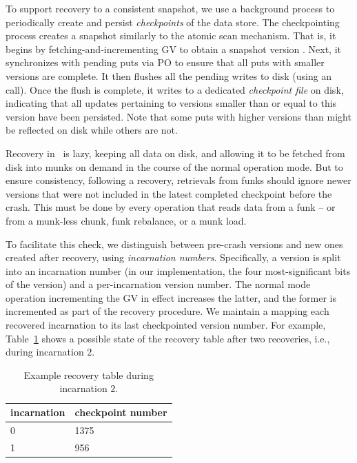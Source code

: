 To support recovery to a consistent snapshot, we use a background process to
periodically create and persist \emph{checkpoints} of the data store.
The checkpointing process creates a snapshot similarly to the atomic scan mechanism. That is, 
it begins by fetching-and-incrementing GV to obtain a 
 snapshot version .  Next, 
it synchronizes with pending puts via PO to ensure that all puts with smaller versions are complete. 
It then flushes all the pending writes to disk (using an  call). 
Once the flush is complete, it writes  to a dedicated \emph{checkpoint file} on disk,
indicating that all updates pertaining to versions smaller than or equal to this version have been persisted.
Note that some puts with higher versions than  might be reflected on disk while others are not. 

Recovery in \sys\ is lazy, keeping all data on disk, and 
allowing it to be fetched from disk into munks  on demand in the course of the normal operation mode. 
But to ensure consistency, following a recovery,  
retrievals from funks should ignore newer versions that were not included in the latest completed checkpoint before the crash. This must be done by every operation that reads data from a funk --  or  from a munk-less chunk, funk rebalance,  or a munk load. 

To facilitate this check, 
we distinguish between pre-crash versions and new ones created after recovery, using \emph{incarnation numbers}. Specifically, a version is split into an incarnation number (in our implementation, the four most-significant bits of the version) and a per-incarnation version number. The normal mode operation incrementing the GV in effect increases the latter, and the former is incremented as part of the recovery procedure. 
We maintain a  mapping each recovered incarnation to its last checkpointed version number. 
For example, Table~\ref{table:recovery} shows a possible state of the recovery table after two recoveries, i.e., during incarnation $2$. 

\begin{table}[h]
\begin{center}
\begin{tabular}{ll}
incarnation & checkpoint number \\
\hline
0 & 1375\\
1 &  956\\
\end{tabular}
\end{center}
\caption{Example recovery table during incarnation $2$.}
\label{table:recovery}
\end{table} 
 
